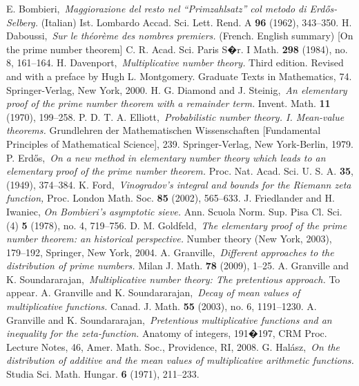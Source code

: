 \documentclass[12pt]{amsart}
\theoremstyle{remark}
\numberwithin{equation}{section}
\begin{document}


\begin{thebibliography}{99}
 E. Bombieri,\,
{\sl Maggiorazione del resto nel ``Primzahlsatz'' col metodo di Erd\H os-Selberg.} (Italian) Ist. Lombardo Accad. Sci. Lett. Rend. A {\bf 96} (1962), 343--350.
 H. Daboussi,\,
{\sl Sur le th\'eor\`eme des nombres premiers.} (French. English summary) [On the prime number theorem] C. R. Acad. Sci. Paris S�r. I Math. {\bf 298} (1984), no. 8, 161--164.
 H. Davenport,\,
{\sl Multiplicative number theory.} Third edition. Revised and with a preface by Hugh L. Montgomery. Graduate Texts in Mathematics, 74. Springer-Verlag, New York, 2000.
 H. G. Diamond and J. Steinig,\,
{\sl An elementary proof of the prime number theorem with a remainder term.} Invent. Math. {\bf 11} (1970), 199--258.
 P. D. T. A. Elliott,\,
{\sl Probabilistic number theory. I. Mean-value theorems.} Grundlehren der Mathematischen Wissenschaften [Fundamental Principles of Mathematical Science], 239. Springer-Verlag, New York-Berlin, 1979.
 P. Erd\H os,\,
{\sl On a new method in elementary number theory which leads to an elementary proof of the prime number theorem.} Proc. Nat. Acad. Sci. U. S. A. {\bf 35}, (1949), 374--384.
 K. Ford,\,
{\sl Vinogradov's integral and bounds for the Riemann zeta function,} Proc. London Math. Soc. {\bf 85} (2002), 565--633.
 J. Friedlander and H. Iwaniec,
{\sl On Bombieri's asymptotic sieve.} Ann. Scuola Norm. Sup. Pisa
Cl. Sci. (4)  {\bf 5}  (1978), no. 4, 719--756.
 D. M. Goldfeld,\,
{\sl The elementary proof of the prime number theorem: an historical perspective.} Number theory (New York, 2003), 179--192, Springer, New York, 2004.
 A. Granville,\,
{\sl Different approaches to the distribution of prime numbers.} Milan J. Math. {\bf 78} (2009), 1--25.
 A. Granville and K. Soundararajan,\,
{\sl Multiplicative number theory: The pretentious approach.} To appear.
 A. Granville and K. Soundararajan,\
{\sl Decay of mean values of multiplicative functions.} Canad. J. Math. {\bf 55} (2003), no. 6, 1191--1230.
\bibitem[GS08]{gs2} A. Granville and K. Soundararajan,\,
{\sl Pretentious multiplicative functions and an inequality for the zeta-function.} Anatomy of integers, 191�197, CRM Proc. Lecture Notes, 46, Amer. Math. Soc., Providence, RI, 2008.
\bibitem[Ha71]{hal2} G. Hal\'asz,\,
{\sl On the distribution of additive and the mean values of multiplicative arithmetic functions.} Studia Sci. Math. Hungar. {\bf 6} (1971), 211--233.

\end{thebibliography}
\end{document}
